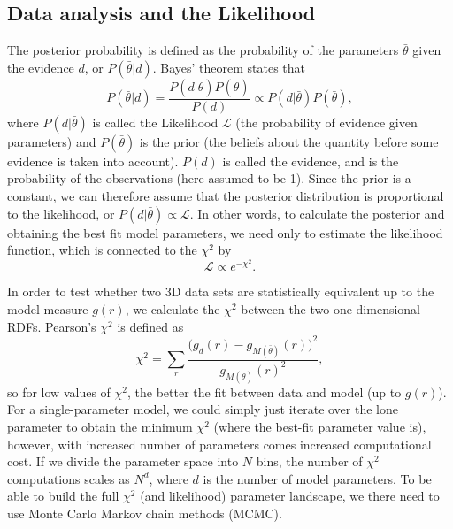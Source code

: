 \documentclass[aps,pre,twocolumn,letterpaper,floatfix,showpacs]{revtex4}
\begin{document}
\subsection{Data analysis and the Likelihood}

The posterior probability is defined as the probability of the parameters $\bar \theta$ given the evidence $d$, or $P(\bar \theta | d)$. Bayes' theorem states that 
\begin{equation}
P(\bar \theta | d) = \frac{P(d | \bar \theta)P(\bar \theta)}{P(d)} \propto P(d | \bar \theta)P(\bar \theta),
\end{equation}
where $P(d | \bar \theta)$ is called the Likelihood $\mathcal L$ (the probability of evidence given parameters) and $P(\bar \theta)$ is the prior (the beliefs about the quantity before some evidence is taken into account). $P(d)$ is called the evidence, and is the probability of the observations (here assumed to be 1). Since the prior is a constant, we can therefore assume that the posterior distribution is proportional to the likelihood, or $P(d | \bar \theta) \propto \mathcal L$. In other words, to calculate the posterior and obtaining the best fit model parameters, we need only to estimate the likelihood function, which is connected to the $\chi^2$ by 
\begin{equation}
\mathcal L \propto e^{-\chi^2}.
\end{equation}


In order to test whether two 3D data sets are statistically equivalent up to the model measure $g(r)$, we calculate the $\chi^2$ between the two one-dimensional RDFs. Pearson's $\chi^2$ is defined as 
\begin{equation}
  \chi^2 = \sum_r \frac{ \Big(g_d(r) - g_{M(\bar \theta)}(r) \Big)^2}{g_{M(\bar \theta)}(r)^2},
\end{equation}
so for low values of $\chi^2$, the better the fit between data and model (up to $g(r)$). For a single-parameter model, we could simply just iterate over the lone parameter to obtain the minimum $\chi^2$ (where the best-fit parameter value is), however, with increased number of parameters comes increased computational cost. If we divide the parameter space into $N$ bins, the number of $\chi^2$ computations scales as $N^d$, where $d$ is the number of model parameters. To be able to build the full $\chi^2$ (and likelihood) parameter landscape, we there need to use Monte Carlo Markov chain methods (MCMC).
\end{document}
